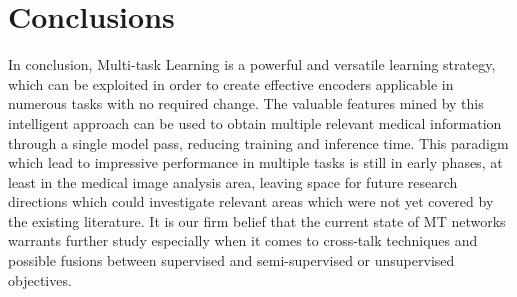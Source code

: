 \chapter{Conclusions}
\label{chapter:5-Conclusions}

In conclusion, Multi-task Learning is a powerful and versatile learning strategy, which can be exploited in order to create effective encoders applicable in numerous tasks with no required change. The valuable features mined by this intelligent approach can be used to obtain multiple relevant medical information through a single model pass, reducing training and inference time. This paradigm which lead to impressive performance in multiple tasks is still in early phases, at least in the medical image analysis area, leaving space for future research directions which could investigate relevant areas which were not yet covered by the existing literature. It is our firm belief that the current state of MT networks warrants further study especially when it comes to  cross-talk techniques and possible fusions between supervised and semi-supervised or unsupervised objectives.  
